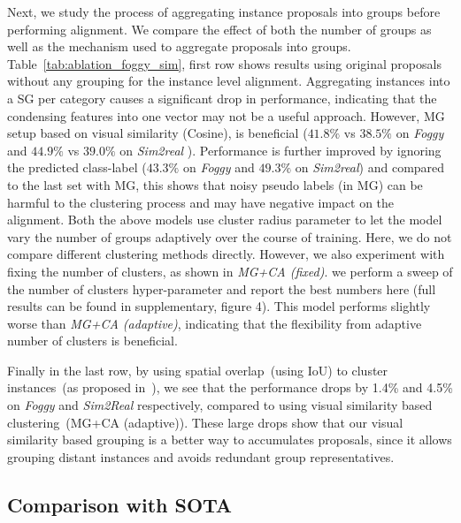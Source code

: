 \documentclass[10pt,twocolumn,letterpaper]{article}
\begin{document}
 Next, we study the process of aggregating instance proposals into groups before performing alignment. We compare the effect of both the number of groups as well as the mechanism used to aggregate proposals into groups. Table~\ref{tab:ablation_foggy_sim}, 
first row shows results using original proposals without any grouping for the instance level alignment. 
Aggregating instances into a SG per category causes a significant drop in performance, indicating that the condensing features into one vector may not be a useful approach. 
However, MG setup based on visual similarity (Cosine), is beneficial ($41.8\%$ vs $38.5\%$ on \emph{Foggy} and $44.9\%$ vs $39.0\%$ on \emph{Sim2real} ).
Performance is further improved by ignoring the predicted class-label ($43.3\%$ on \emph{Foggy} and $49.3\%$ on \emph{Sim2real}) and compared to the last set with MG, this shows that noisy pseudo labels (in MG) can be harmful to the clustering process and may have negative impact on the alignment.
Both the above models use cluster radius parameter to let the model vary the number of groups adaptively over the course of training.
Here, we do not compare different clustering methods directly. However, we also experiment with fixing the number of clusters, as shown in \emph{MG+CA (fixed)}. we perform a sweep of the number of clusters hyper-parameter and report the best numbers here (full results can be found in supplementary, figure 4). 
This model performs slightly worse than \emph{MG+CA (adaptive)}, indicating that the flexibility from adaptive number of clusters is beneficial.

Finally in the last row, 
by using spatial overlap~(using IoU) to cluster instances~(as proposed in~\cite{GPA, zheng_cvpr20_prototype}), we see that the performance drops by 1.4\% and 4.5\% on \emph{Foggy} and \emph{Sim2Real} respectively, compared to using visual similarity based clustering~(MG+CA (adaptive)). These large drops show that our visual similarity based grouping is a better way to accumulates proposals, since it allows grouping distant instances and avoids redundant group representatives. 

\subsection{Comparison with SOTA}
\label{sec:comppriorwork}
\end{document}
